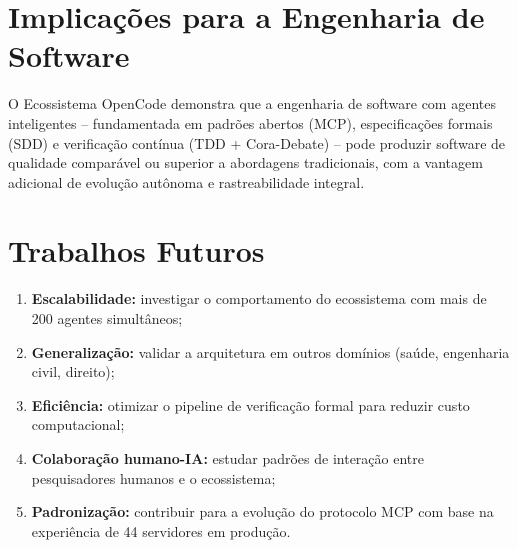 \documentclass[12pt,a4paper,sumario=tradicional]{abntex2}
\begin{document}
\section{Implicações para a Engenharia de Software}

O Ecossistema OpenCode demonstra que a engenharia de software com agentes inteligentes -- fundamentada em padrões abertos (MCP), especificações formais (SDD) e verificação contínua (TDD + Cora-Debate) -- pode produzir software de qualidade comparável ou superior a abordagens tradicionais, com a vantagem adicional de evolução autônoma e rastreabilidade integral.

\section{Trabalhos Futuros}

\begin{enumerate}
    \item \textbf{Escalabilidade:} investigar o comportamento do ecossistema com mais de 200 agentes simultâneos;
    \item \textbf{Generalização:} validar a arquitetura em outros domínios (saúde, engenharia civil, direito);
    \item \textbf{Eficiência:} otimizar o pipeline de verificação formal para reduzir custo computacional;
    \item \textbf{Colaboração humano-IA:} estudar padrões de interação entre pesquisadores humanos e o ecossistema;
    \item \textbf{Padronização:} contribuir para a evolução do protocolo MCP com base na experiência de 44 servidores em produção.
\end{enumerate}


\end{document}
